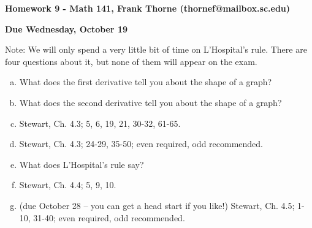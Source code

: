 \documentclass[12pt]{article}
\begin{document}
\setlength{\topmargin}{-2mm}





\begin{center}{\bf Homework 9 - Math 141, Frank Thorne (thornef@mailbox.sc.edu)}
\end{center}
\begin{center}
{\bf Due Wednesday, October 19}
\end{center}

Note: We will only spend a very little bit of time on L'Hospital's rule. There are four
questions about it, but none of them will 
appear on the exam.
\begin{enumerate}[(a)]
\item
What does the first derivative tell you about the shape of a graph?

\item
What does the second derivative tell you about the shape of a graph?

\item
Stewart, Ch. 4.3; 5, 6, 19, 21, 30-32, 61-65.

\item
Stewart, Ch. 4.3; 24-29, 35-50; even required, odd recommended.

\item
What does L'Hospital's rule say?

\item
Stewart, Ch. 4.4; 5, 9, 10.

\item (due October 28 -- you can get a head start if you like!)
Stewart, Ch. 4.5; 1-10, 31-40; even required, odd recommended.

\end{enumerate}
\end{document}
